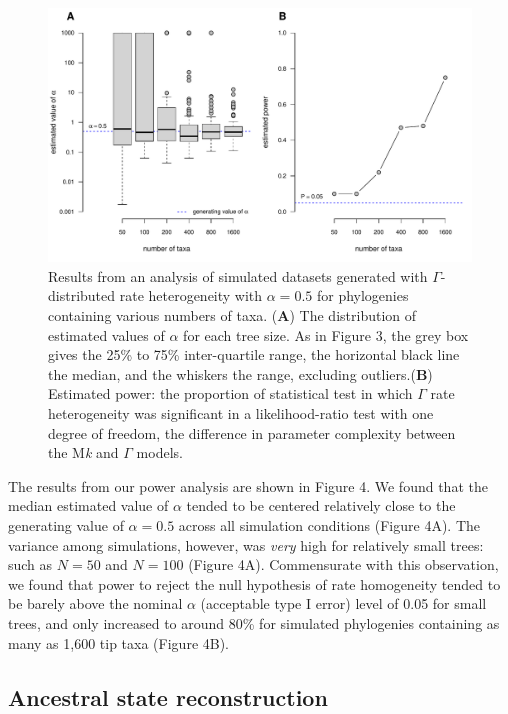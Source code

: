 \documentclass[fleqn,10pt,lineno]{wlpeerj} %
\begin{document}
\begin{figure}
\includegraphics[width=1\linewidth]{Revell-and-Harmon.fitgammaMk.PeerJ_files/figure-latex/unnamed-chunk-7-1} \caption{Results from an analysis of simulated datasets generated with $\Gamma$-distributed rate heterogeneity with $\alpha = 0.5$ for phylogenies containing various numbers of taxa. (\textbf{A}) The distribution of estimated values of $\alpha$ for each tree size. As in Figure 3, the grey box gives the 25\% to 75\% inter-quartile range, the horizontal black line the median, and the whiskers the range, excluding outliers.(\textbf{B}) Estimated power: the proportion of statistical test in which $\Gamma$ rate heterogeneity was significant in a likelihood-ratio test with one degree of freedom, the difference in parameter complexity between the M\emph{k} and $\Gamma$ models.}\label{fig:unnamed-chunk-7}
\end{figure}

The results from our power analysis are shown in Figure 4. We found that the median estimated value of \(\alpha\) tended to be centered relatively close to the generating value of \(\alpha = 0.5\) across all simulation conditions (Figure 4A). The variance among simulations, however, was \emph{very} high for relatively small trees: such as \(N = 50\) and \(N = 100\) (Figure 4A). Commensurate with this observation, we found that power to reject the null hypothesis of rate homogeneity tended to be barely above the nominal \(\alpha\) (acceptable type I error) level of 0.05 for small trees, and only increased to around 80\% for simulated phylogenies containing as many as 1,600 tip taxa (Figure 4B).

\subsection{Ancestral state reconstruction}\label{ancestral-state-reconstruction}
\end{document}
